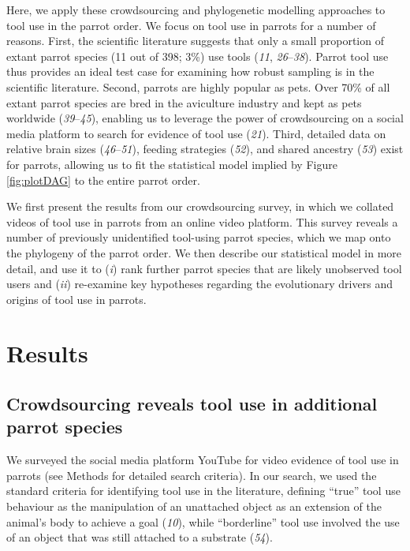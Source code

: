 \documentclass[
  man,floatsintext]{apa6}
\begin{document}
Here, we apply these crowdsourcing and phylogenetic modelling approaches to tool
use in the parrot order. We focus on tool use in parrots for a number of
reasons. First, the scientific literature suggests that only a small proportion
of extant parrot species (11 out of 398; 3\%) use tools
(\emph{11}, \emph{26}--\emph{38}). Parrot tool use
thus provides an ideal test case for examining how robust sampling is in the
scientific literature. Second, parrots are highly popular as pets. Over 70\% of
all extant parrot species are bred in the aviculture industry and kept as pets
worldwide (\emph{39}--\emph{45}), enabling us to leverage the power of crowdsourcing on a social
media platform to search for evidence of tool use (\emph{21}). Third, detailed
data on relative brain sizes (\emph{46}--\emph{51}), feeding strategies (\emph{52}), and
shared ancestry (\emph{53}) exist for parrots, allowing us to fit the
statistical model implied by Figure \ref{fig:plotDAG} to the entire parrot
order.

We first present the results from our crowdsourcing survey, in which we collated
videos of tool use in parrots from an online video platform. This survey reveals
a number of previously unidentified tool-using parrot species, which we map onto
the phylogeny of the parrot order. We then describe our statistical model in
more detail, and use it to (\emph{i}) rank further parrot species that are likely
unobserved tool users and (\emph{ii}) re-examine key hypotheses regarding the
evolutionary drivers and origins of tool use in parrots.

\hypertarget{results}{%
\section{Results}\label{results}}

\hypertarget{crowdsourcing-reveals-tool-use-in-additional-parrot-species}{%
\subsection{Crowdsourcing reveals tool use in additional parrot species}\label{crowdsourcing-reveals-tool-use-in-additional-parrot-species}}

We surveyed the social media platform YouTube for video evidence of tool use in
parrots (see Methods for detailed search criteria). In our search, we used the
standard criteria for identifying tool use in the literature, defining ``true''
tool use behaviour as the manipulation of an unattached object as an extension
of the animal's body to achieve a goal (\emph{10}), while ``borderline'' tool
use involved the use of an object that was still attached to a substrate
(\emph{54}).
\end{document}
